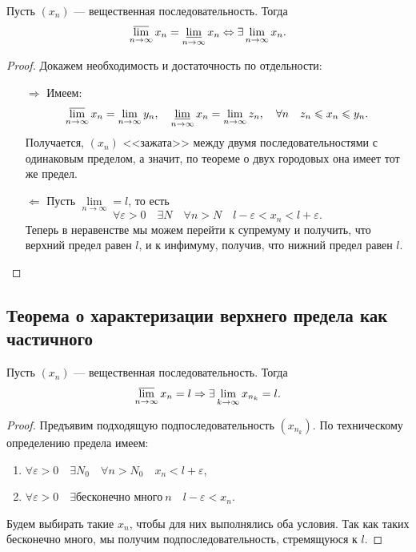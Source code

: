 \begin{theorem}
	Пусть \((x_n)\) --- вещественная последовательность. Тогда \[
	\varlimsup_{n \to \infty} x_n = \varliminf_{n \to \infty} x_n \Leftrightarrow \exists \lim_{n \to \infty} x_n.
	\]
\end{theorem}

\begin{proof}
	Докажем необходимость и достаточность по отдельности:
	\begin{enumerate}
		\item[\(\Rightarrow\)] Имеем: \[
		\varlimsup_{n \to \infty} x_n = \lim_{n \to \infty} y_n, \quad
		\varliminf_{n \to \infty} x_n = \lim_{n \to \infty} z_n, \quad
		\forall n \quad z_n \leqslant x_n \leqslant y_n.
		\]
		Получается, \((x_n)\) <<зажата>> между двумя последовательностями с одинаковым пределом, а значит, по теореме о двух городовых она имеет тот же предел.
		\item[\(\Leftarrow\)] Пусть \(\lim\limits_{n \to \infty} = l\), то есть \[
		\forall \varepsilon > 0 \quad \exists N \quad \forall n > N \quad l - \varepsilon < x_n < l + \varepsilon.
		\]
		Теперь в неравенстве мы можем перейти к супремуму и получить, что верхний предел равен \(l\), и к инфимуму, получив, что нижний предел равен \(l\). 
	\end{enumerate} 
\end{proof}

\subsection{Теорема о характеризации верхнего предела как частичного}

\begin{theorem}
	Пусть \((x_n)\) --- вещественная последовательность. Тогда \[
	\varlimsup_{n \to \infty} x_n = l \Rightarrow \exists \lim_{k \to \infty} x_{n_k} = l.
	\]
\end{theorem}

\begin{proof}
	Предъявим подходящую подпоследовательность \((x_{n_k})\). По техническому определению предела имеем:
	\begin{enumerate}
		\item \(\forall \varepsilon > 0 \quad \exists N_0 \quad \forall n > N_0 \quad x_n < l + \varepsilon\),
		\item \(\forall \varepsilon > 0 \quad \exists \textit{бесконечно много} \ n \quad l - \varepsilon < x_n\).
	\end{enumerate}
	Будем выбирать такие \(x_n\), чтобы для них выполнялись оба условия. Так как таких бесконечно много, мы получим подпоследовательность, стремящуюся к \(l\).
\end{proof}

